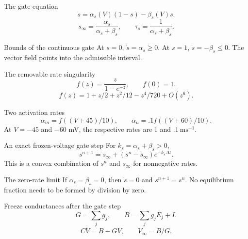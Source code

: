 \documentclass[aspectratio=169,11pt]{beamer}
\newcommand{\notestarget}{notes.pdf}\newcommand{\noteslabel}{Notes}
\begin{document}
\begin{frame}[t,fragile,label=slide-the-gate-equation]{The gate equation}
\[\dot s=\alpha_s(V)(1-s)-\beta_s(V)s.\]\pause{}\[s_\infty=\frac{\alpha_s}{\alpha_s+\beta_s},\qquad \tau_s=\frac1{\alpha_s+\beta_s}.\]
\end{frame}
\renewcommand{\notestarget}{notes.pdf\#note-conductances-and-gate-relaxation}
\begin{frame}[t,fragile,label=slide-bounds-of-the-continuous-gate]{Bounds of the continuous gate}
At $s=0$, $\dot s=\alpha_s\ge0$. At $s=1$, $\dot s=-\beta_s\le0$.\pause{} The vector field points into the admissible interval.
\end{frame}
\renewcommand{\notestarget}{notes.pdf\#note-finite-evaluation-of-the-rate-functions}
\begin{frame}[t,fragile,label=slide-the-removable-rate-singularity]{The removable rate singularity}
\[f(z)=\frac z{1-e^{-z}},\qquad f(0)=1.\]\pause{}\[f(z)=1+z/2+z^2/12-z^4/720+O(z^6).\]
\end{frame}
\renewcommand{\notestarget}{notes.pdf\#note-finite-evaluation-of-the-rate-functions}
\begin{frame}[t,fragile,label=slide-two-activation-rates]{Two activation rates}
\[\alpha_m=f((V+45)/10),\qquad\alpha_n=.1f((V+60)/10).\]\pause{} At $V=-45$ and $-60$ mV, the respective rates are $1$ and $.1\ \mathrm{ms}^{-1}$.
\end{frame}
\renewcommand{\notestarget}{notes.pdf\#note-exponential-gate-and-voltage-substeps}
\begin{frame}[t,fragile,label=slide-an-exact-frozen-voltage-gate-step]{An exact frozen-voltage gate step}
For $k_s=\alpha_s+\beta_s>0$,\[s^{n+1}=s_\infty+(s^n-s_\infty)e^{-k_s\Delta t}.\]\pause{} This is a convex combination of $s^n$ and $s_\infty$ for nonnegative rates.
\end{frame}
\renewcommand{\notestarget}{notes.pdf\#note-exponential-gate-and-voltage-substeps}
\begin{frame}[t,fragile,label=slide-the-zero-rate-limit]{The zero-rate limit}
If $\alpha_s=\beta_s=0$, then $\dot s=0$ and $s^{n+1}=s^n$.\pause{} No equilibrium fraction needs to be formed by division by zero.
\end{frame}
\renewcommand{\notestarget}{notes.pdf\#note-exponential-gate-and-voltage-substeps}
\begin{frame}[t,fragile,label=slide-freeze-conductances-after-the-gate-step]{Freeze conductances after the gate step}
\[G=\sum_jg_j,\qquad B=\sum_jg_jE_j+I.\]\pause{}\[C\dot V=B-GV,\qquad V_\infty=B/G.\]
\end{frame}
\end{document}
